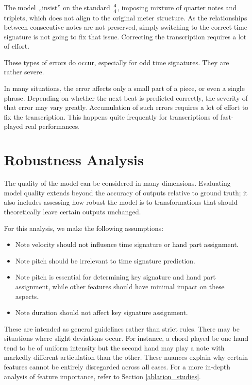 The model ,,insist'' on the standard ${4 \atop 4}$, imposing mixture of quarter notes and triplets, which does not align to the original meter structure. As the relationships between consecutive notes are not preserved, simply switching to the correct time signature is not going to fix that issue. Correcting the transcription requires a lot of effort.

These types of errors do occur, especially for odd time signatures. They are rather severe. 

In many situations, the error affects only a small part of a piece, or even a single phrase. Depending on whether the next beat is predicted correctly, the severity of that error may vary greatly. Accumulation of such errors requires a lot of effort to fix the transcription. This happens quite frequently for transcriptions of fast-played real performances.

\section{Robustness Analysis} \label{robustness_analysis}

The quality of the model can be considered in many dimensions. Evaluating model quality extends beyond the accuracy of outputs relative to ground truth; it also includes assessing how robust the model is to transformations that should theoretically leave certain outputs unchanged.

For this analysis, we make the following assumptions: \begin{itemize} \item Note velocity should not influence time signature or hand part assignment. \item Note pitch should be irrelevant to time signature prediction. \item Note pitch is essential for determining key signature and hand part assignment, while other features should have minimal impact on these aspects. \item Note duration should not affect key signature assignment. \end{itemize} These are intended as general guidelines rather than strict rules. There may be situations where slight deviations occur. For instance, a chord played be one hand tend to be of uniform intensity but the second hand may play a note with markedly different articulation than the other. These nuances explain why certain features cannot be entirely disregarded across all cases. For a more in-depth analysis of feature importance, refer to Section \ref{ablation_studies}.

